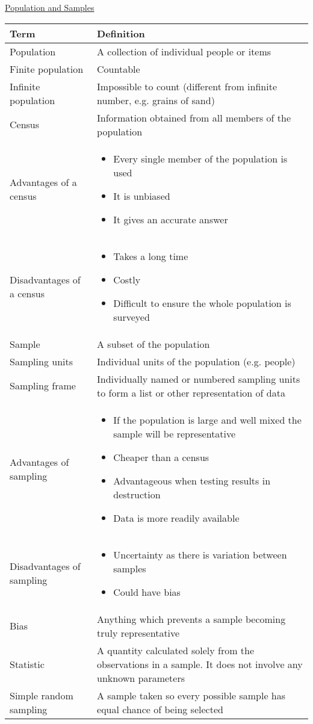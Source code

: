 \documentclass{article}[18pt]
\begin{document}
\begin{center}
\underline{\huge Population and Samples}
\end{center}
\begin{tabularx}{\textwidth}{|X|X|}
\hline
  \textbf{Term} & \textbf{Definition} \\
\hline
Population&A collection of individual people or items\\
\hline
Finite population&Countable\\
\hline
Infinite population&Impossible to count (different from infinite number, e.g. grains of sand)\\
\hline
Census&Information obtained from all members of the population\\
\hline
Advantages of a census&
\begin{itemize}
\item Every single member of the population is used
\item It is unbiased
\item It gives an accurate answer
\end{itemize}\\
\hline
Disadvantages of a census&
\begin{itemize}
\item Takes a long time
\item Costly
\item Difficult to ensure the whole population is surveyed
\end{itemize}\\
\hline
Sample&A subset of the population\\
\hline
Sampling units&Individual units of the population (e.g. people)\\
\hline
Sampling frame&Individually named or numbered sampling units to form a list or other representation of data\\
\hline
Advantages of sampling&
\begin{itemize}
\item If the population is large and well mixed the sample will be representative
\item Cheaper than a census
\item Advantageous when testing results in destruction
\item Data is more readily available
\end{itemize}\\
\hline
Disadvantages of sampling&
\begin{itemize}
\item Uncertainty as there is variation between samples
\item Could have bias
\end{itemize}\\
\hline
Bias&Anything which prevents a sample becoming truly representative\\
\hline
Statistic&A quantity calculated solely from the observations in a sample. It does not involve any unknown parameters\\
\hline
Simple random sampling&A sample taken so every possible sample has equal chance of being selected\\
\hline
\end{tabularx}
\end{document}
